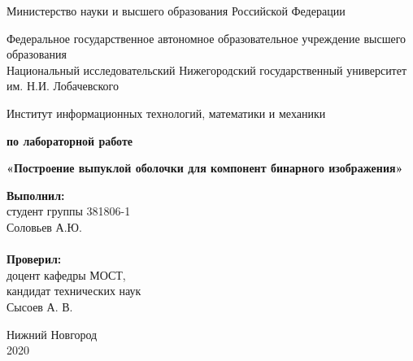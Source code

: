 \documentclass{report}
\begin{document}
\begin{titlepage}

\begin{center}
Министерство науки и высшего образования Российской Федерации
\end{center}

\begin{center}
Федеральное государственное автономное образовательное учреждение высшего образования \\
Национальный исследовательский Нижегородский государственный университет им. Н.И. Лобачевского
\end{center}

\begin{center}
Институт информационных технологий, математики и механики
\end{center}

\vspace{4em}

\begin{center}
\textbf{ по лабораторной работе} \\
\end{center}
\begin{center}
\textbf{\Large«Построение выпуклой оболочки для компонент бинарного изображения»} \\
\end{center}

\vspace{4em}

\newbox{\lbox}
\newlength{\maxl}
\setlength{\maxl}{\wd\lbox}
\hfill\parbox{7cm}{
\hspace*{5cm}\hspace*{-5cm}\textbf{Выполнил:} \\ студент группы 381806-1 \\ Соловьев А.Ю.\\
\\
\hspace*{5cm}\hspace*{-5cm}\textbf{Проверил:}\\ доцент кафедры МОСТ, \\ кандидат технических наук \\ Сысоев А. В.\\
}
\vspace{\fill}

\begin{center} Нижний Новгород \\ 2020 \end{center}

\end{titlepage}
\end{document}

